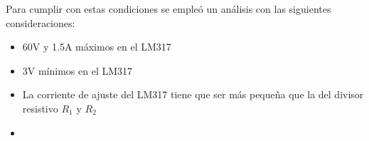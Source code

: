 \documentclass[letterpaper, 10 pt, conference]{ieeeconf}  %
\begin{document}
Para cumplir con estas condiciones se empleó un análisis con las siguientes consideraciones:
\begin{itemize}
  \item{60V y 1.5A máximos en el LM317}
  \item{3V mínimos en el LM317}
  \item{La corriente de ajuste del LM317 tiene que ser más pequeña que la del divisor resistivo $R_1$ y $R_2$}
  \item{}
\end{itemize}
\end{document}
